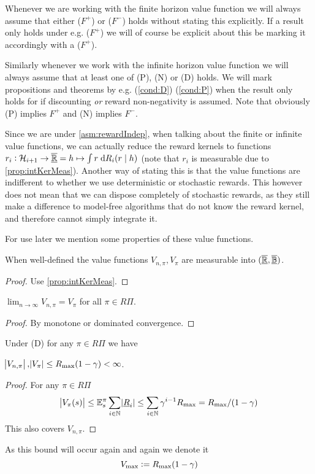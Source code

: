 \begin{rem}
  Whenever we are working with the finite horizon value function
  we will always assume that either ($F^+$) or ($F^-$) holds without
  stating this explicitly.
  If a result only holds under e.g. ($F^+$) we will of course be explicit
  about this be marking it accordingly with a ($F^+$).

  Similarly whenever we work with the infinite horizon value function we will
  always assume that at least one of (P), (N) or (D) holds.
  We will mark propositions and theorems
  by e.g. (\cref{cond:D}) (\cref{cond:P}) when
  the result only holds for if discounting \emph{or} reward non-negativity
  is assumed.
  Note that obviously (P) implies $F^+$ and (N) implies $F^-$.
\end{rem}

\begin{rem}
Since we are under \cref{asm:rewardIndep}, when talking about the finite
or infinite value functions,
we can actually reduce the reward kernels to functions
$r_i : \mathcal{H}_{i+1} \to \overline{\underline{\mathbb{R}}} = h \mapsto \int r \; \mathrm{d} R_i(r \mid h)$
(note that $r_i$ is measurable due to \cref{prop:intKerMeas}).
Another way of stating this is that the value functions are indifferent
to whether we use deterministic or stochastic rewards.
This however does not mean that we can dispose completely of stochastic
rewards, as they still make a difference to model-free algorithms that
do not know the reward kernel, and therefore cannot simply integrate it.
\end{rem}

For use later we mention some properties of these value functions.
\begin{prop} 
  When well-defined the value functions $V_{n,\pi}, V_\pi$ are measurable
  into $(\underline{\overline{\mathbb{R}}}, \underline{\overline{\mathbb{B}}})$.
\end{prop}
\begin{proof}  
  Use \cref{prop:intKerMeas}.
\end{proof}

\begin{prop}
  $\lim_{n\to\infty} V_{n, \pi} = V_\pi $
  for all $\pi \in R\Pi$.
  \label{prop:VnLimV}
\end{prop}
\begin{proof}
  By monotone or dominated convergence.
\end{proof}

\begin{prop} Under (D) for any $\pi \in R\Pi$ we have

  $\abs{V_{n,\pi}}, \abs{V_\pi} \leq R_{\max} (1 - \gamma) < \infty$.
  \label{prop:Vbounded}
\end{prop}
\begin{proof}
  For any $\pi \in R\Pi$
  \[ \abs{V_\pi(s)} \leq \mathbb{E}_s^\pi \sum_{i \in \mathbb{N}} \abs{\underline{R}_i}
    \leq \sum_{i \in \mathbb{N}} \gamma^{i-1} R_{\max}
  = R_{\max} / (1-\gamma) \]
  This also covers $V_{n, \pi}$.
\end{proof}
As this bound will occur again and again we denote it
\[ V_{\max} \vcentcolon= R_{\max}(1-\gamma) \]

